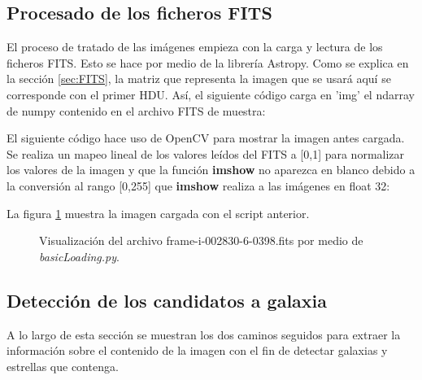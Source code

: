 \documentclass[a4paper,12pt]{article}
\begin{document}
\subsection{Procesado de los ficheros FITS}
\label{sec:Procesado}
El proceso de tratado de las imágenes empieza con la carga y lectura de los ficheros FITS. Esto se hace por medio de la librería Astropy. Como se explica en la sección \ref{sec:FITS}, la matriz que representa la imagen que se usará aquí se corresponde con el primer HDU. Así, el siguiente código carga en 'img' el ndarray de numpy contenido en el archivo FITS de muestra:



El siguiente código hace uso de OpenCV para mostrar la imagen antes cargada. Se realiza un mapeo lineal de los valores leídos del FITS a [0,1] para normalizar los valores de la imagen y que la función \textbf{imshow} no aparezca en blanco debido a la conversión al rango [0,255] que \textbf{imshow}\cite{imshow} realiza a las imágenes en float 32:



La figura \ref{fig:img1} muestra la imagen cargada con el script anterior.
\begin{figure}[h!]
\centering
{}
\caption{Visualización del archivo frame-i-002830-6-0398.fits por medio de \textit{basicLoading.py}.}
\label{fig:img1}
\end{figure}

\subsection{Detección de los candidatos a galaxia}
A lo largo de esta sección se muestran los dos caminos seguidos para extraer la información sobre el contenido de la imagen con el fin de detectar galaxias y estrellas que contenga.
\end{document}

